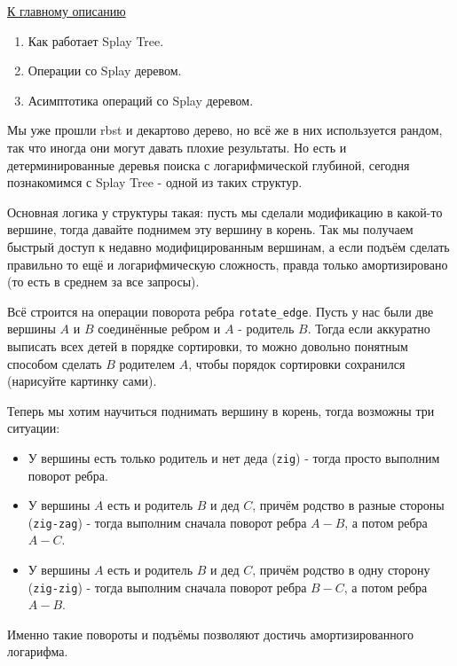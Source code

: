 \label{md2tex10}
\hyperref[md2texREADME]{К главному описанию}


\begin{enumerate}
    \item Как работает Splay Tree.
    \item Операции со Splay деревом.
    \item Асимптотика операций со Splay деревом.
\end{enumerate}


Мы уже прошли rbst и декартово дерево, но всё же в них используется рандом, так что иногда они могут давать плохие результаты. Но есть и детерминированные деревья поиска с логарифмической глубиной, сегодня познакомимся с Splay Tree - одной из таких структур.


Основная логика у структуры такая: пусть мы сделали модификацию в какой-то вершине, тогда давайте поднимем эту вершину в корень. Так мы получаем быстрый доступ к недавно модифицированным вершинам, а если подъём сделать правильно то ещё и логарифмическую сложность, правда только амортизировано (то есть в среднем за все запросы).

Всё строится на операции поворота ребра \texttt{rotate_edge}. Пусть у нас были две вершины $A$ и $B$ соединённые ребром и $A$ - родитель $B$. Тогда если аккуратно выписать всех детей в порядке сортировки, то можно довольно понятным способом сделать $B$ родителем $A$, чтобы порядок сортировки сохранился (нарисуйте картинку сами).

Теперь мы хотим научиться поднимать вершину в корень, тогда возможны три ситуации:
\begin{itemize}
    \item У вершины есть только родитель и нет деда (\texttt{zig}) - тогда просто выполним поворот ребра.
    \item У вершины $A$ есть и родитель $B$ и дед $C$, причём родство в разные стороны (\texttt{zig-zag}) - тогда выполним сначала поворот ребра $A - B$, а потом ребра $A - C$.
    \item У вершины $A$ есть и родитель $B$ и дед $C$, причём родство в одну сторону (\texttt{zig-zig}) - тогда выполним сначала поворот ребра $B - C$, а потом ребра $A - B$.
\end{itemize}

Именно такие повороты и подъёмы позволяют достичь амортизированного логарифма.


